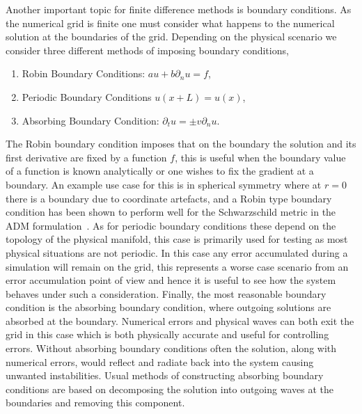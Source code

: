 \documentclass[10pt]{report}
\theoremstyle{definition}
\begin{document}
Another important topic for finite difference methods is boundary conditions. As the numerical grid is finite one must consider what happens to the numerical solution at the boundaries of the grid. Depending on the physical scenario we consider three different methods of imposing boundary conditions,
\begin{enumerate}
    \item Robin Boundary Conditions: $a u + b \partial_n u = f$,
    \item Periodic Boundary Conditions $u(x+L) = u(x)$,
    \item Absorbing Boundary Condition: $\partial_t u = \pm v \partial_n u$.
\end{enumerate}
The Robin boundary condition imposes that on the boundary the solution and its first derivative are fixed by a function $f$, this is useful when the boundary value of a function is known analytically or one wishes to fix the gradient at a boundary. An example use case for this is in spherical symmetry where at $r = 0$ there is a boundary due to coordinate artefacts, and a Robin type boundary condition has been shown to perform well for the Schwarzschild metric in the ADM formulation~\cite{AlcubierreMiguelIntro3+12008}. As for periodic boundary conditions these depend on the topology of the physical manifold, this case is primarily used for testing as most physical situations are not periodic. In this case any error accumulated during a simulation will remain on the grid, this represents a worse case scenario from an error accumulation point of view and hence it is useful to see how the system behaves under such a consideration. Finally, the most reasonable boundary condition is the absorbing boundary condition, where outgoing solutions are absorbed at the boundary. Numerical errors and physical waves can both exit the grid in this case which is both physically accurate and useful for controlling errors. Without absorbing boundary conditions often the solution, along with numerical errors, would reflect and radiate back into the system causing unwanted instabilities. Usual methods of constructing absorbing boundary conditions are based on decomposing the solution into outgoing waves at the boundaries and removing this component.
\end{document}

